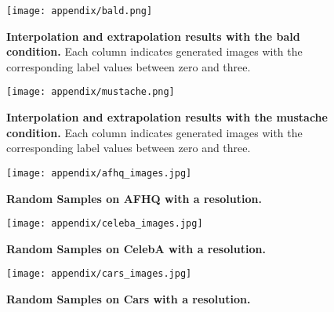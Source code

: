 \documentclass[nohyperref]{article}
\theoremstyle{plain}
\theoremstyle{definition}
\theoremstyle{remark}
\begin{document}
\begin{figure}[h]
\begin{center}
\centerline{\texttt{[image: appendix/bald.png]}}
\caption{\textbf{Interpolation and extrapolation results with the bald condition.} Each column indicates generated images with the corresponding label values between zero and three.}
\label{figure_19}
\end{center}
\vskip -0.2in
\end{figure}


\begin{figure}[h]
\begin{center}
\centerline{\texttt{[image: appendix/mustache.png]}}
\caption{\textbf{Interpolation and extrapolation results with the mustache condition.} Each column indicates generated images with the corresponding label values between zero and three.}
\label{figure_20}
\end{center}
\vskip -0.2in
\end{figure}




\begin{figure}[ht]
\begin{center}
\centerline{\texttt{[image: appendix/afhq\_images.jpg]}}
\caption{\textbf{Random Samples on AFHQ with a  resolution.}}
\label{figure_21}
\end{center}
\vskip -0.2in
\end{figure}


\begin{figure}[ht]
\begin{center}
\centerline{\texttt{[image: appendix/celeba\_images.jpg]}}
\caption{\textbf{Random Samples on CelebA with a  resolution.}}
\label{figure_22}
\end{center}
\vskip -0.2in
\end{figure}



\begin{figure}[ht]
\begin{center}
\centerline{\texttt{[image: appendix/cars\_images.jpg]}}
\caption{\textbf{Random Samples on Cars with a  resolution.}}
\label{figure_23}
\end{center}
\vskip -0.2in
\end{figure}
\end{document}
